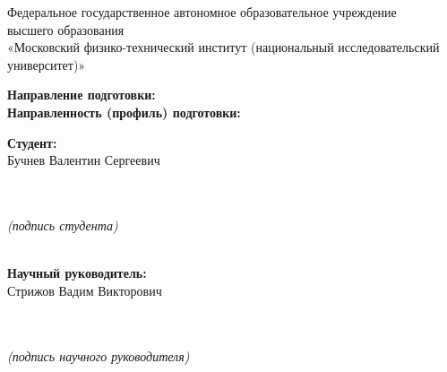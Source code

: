 \documentclass[12pt, a4paper]{scrartcl}
\theoremstyle{plain}
\theoremstyle{definition}
\begin{document}
 		\begin{center}
 			Федеральное государственное автономное образовательное учреждение\\
 			высшего образования\\ 
 			«Московский физико-технический институт (национальный исследовательский университет)»\\
 		\end{center}
		
 		\begin{flushleft}
 			\textbf{Направление подготовки:} \\
 			\textbf{Направленность (профиль) подготовки:} 
 		\end{flushleft}
			
 		\hfill \break
 		\hfill \break

        
        \hfill \break
 		\hfill \break
        
        \linespread{1.0}
         \begin{flushright}
             \begin{minipage}{200pt}
             \textbf{Студент:}\\
             \normalsize{Бучнев Валентин Сергеевич}\\
             \normalsize{}\\
             \underline{\hspace{200pt}}\\
             \centerline{\small\textit{(подпись студента)}}
             \normalsize{}\\
             \textbf{Научный руководитель:}\\
             \normalsize{Стрижов Вадим Викторович}\\
             \normalsize{}\\
             \underline{\hspace{200pt}}\\
             \centerline{\small\textit{(подпись научного руководителя)}}\\
            \end{minipage}
         \end{flushright}
        
\end{document}
